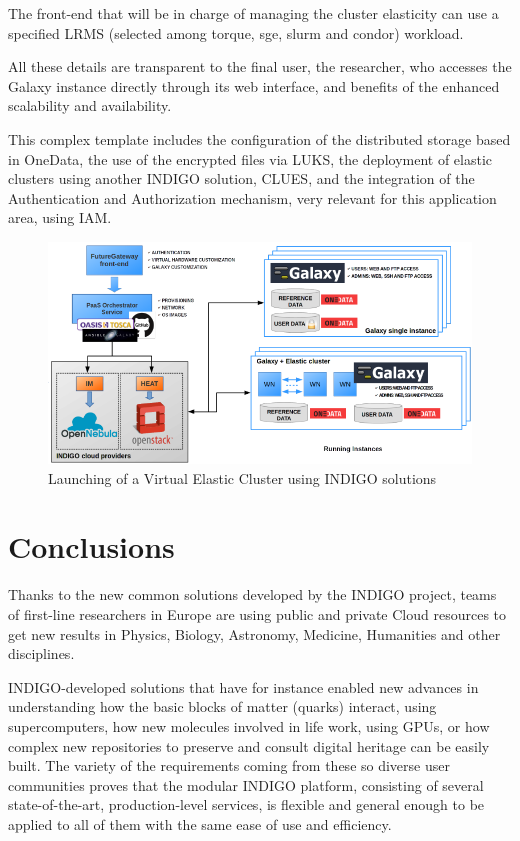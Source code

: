 \documentclass{article}
\begin{document}
\begin{itemize}
The front-end that will be in charge of managing the cluster elasticity can use a specified LRMS (selected among torque, sge, slurm and condor) workload.

All these details are transparent to the final user, the researcher, who accesses the Galaxy instance directly through its web interface, and benefits of the enhanced scalability and availability.

This complex template includes the configuration of the distributed storage based in OneData, the use of the encrypted files via LUKS, the deployment of elastic clusters using another INDIGO solution, CLUES, and the integration of the Authentication and Authorization mechanism, very relevant for this application area, using IAM.  

\begin{figure}
  \centering
  \includegraphics[width=\textwidth]{./figs/Figure14.pdf}
  \caption{Launching of a Virtual Elastic Cluster using INDIGO solutions}
  \label{fig:14}
\end{figure}



\end{itemize}





\section{Conclusions}
\label{sec:conclusions}

Thanks to the new common solutions developed by the INDIGO project, teams of first-line researchers in Europe are using public and private Cloud resources to get new results in Physics, Biology, Astronomy, Medicine, Humanities and other disciplines. 

INDIGO-developed solutions that have for instance enabled new advances in understanding how the basic blocks of matter (quarks) interact, using supercomputers, how new molecules involved in life work, using GPUs, or how complex new repositories to preserve and consult digital heritage can be easily built. The variety of the requirements coming from these so diverse user communities proves that the modular INDIGO platform, consisting of several state-of-the-art, production-level services, is flexible and general enough to be applied to all of them with the same ease of use and efficiency. 
\end{document}
